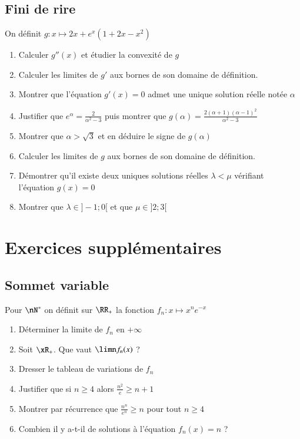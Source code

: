 \documentclass[oneside,12pt]{article}          %
\begin{document}
\subsection{Fini de rire}
On définit $g : x \mapsto 2x + e^x(1+2x-x^2)$
\begin{enumerate}
    \item Calculer $g''(x)$ et étudier la convexité de $g$
    \item Calculer les limites de $g'$ aux bornes de son domaine de définition.
    \item Montrer que l'équation $g'(x)=0$ admet une unique solution réelle notée $\alpha$
    \item Justifier que $e^\alpha=\frac{2}{\alpha^2-3}$ puis montrer que $g(\alpha)=\frac{2(\alpha+1)(\alpha-1)^2}{\alpha^2-3}$
    \item Montrer que $\alpha>\sqrt{3}$ et en déduire le signe de $g(\alpha)$
    \item Calculer les limites de $g$ aux bornes de son domaine de définition.
    \item Démontrer qu'il existe deux uniques solutions réelles $\lambda<\mu$ vérifiant l'équation $g(x)=0$
    \item Montrer que $\lambda\in]-1;0[$ et que $\mu\in]2;3[$
\end{enumerate}



\section{Exercices supplémentaires}

\subsection{Sommet variable}
Pour $\nN^*$ on définit sur $\RR_+$ la fonction $f_n:x\mapsto x^ne^{-x}$
\begin{enumerate}
	\item Déterminer la limite de $f_n$ en $+\infty$
	\item Soit $\xR_+$. Que vaut $\limn f_n(x)$ ?
	\item Dresser le tableau de variations de $f_n$
	\item Justifier que si $n\geq4$ alors $\frac{n^2}{e}\geq n+1$
	\item Montrer par récurrence que $\frac{n^n}{e^n}\geq n$ pour tout $n\geq4$
	\item Combien il y a-t-il de solutions à l'équation $f_n(x)=n$ ?
\end{enumerate}
\end{document}
